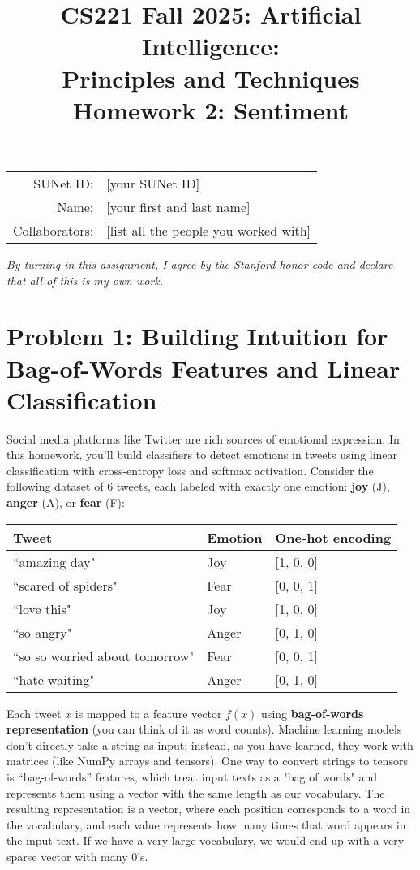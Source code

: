 \documentclass{article}
\title{\textbf{CS221 Fall 2025: Artificial Intelligence:\\ Principles and Techniques} \\Homework 2: Sentiment}
\date{}
\theoremstyle{case}
\theoremstyle{definition}
\begin{document}
\maketitle

\begin{center}
\begin{tabular}{rl}
SUNet ID: & [your SUNet ID] \\
Name: & [your first and last name] \\
Collaborators: & [list all the people you worked with]
\end{tabular}
\end{center}

\textit{By turning in this assignment, I agree by the Stanford honor code and declare
that all of this is my own work.} \\

\fontsize{12pt}{16pt}\selectfont

\section*{Problem 1: Building Intuition for Bag-of-Words Features and Linear Classification}

Social media platforms like Twitter are rich sources of emotional expression. In this homework, you'll build classifiers to detect emotions in tweets using linear classification with cross-entropy loss and softmax activation. Consider the following dataset of 6 tweets, each labeled with exactly one emotion: \textbf{joy} (J), \textbf{anger} (A), or \textbf{fear} (F):

\begin{table}[h]
\centering
\begin{tabular}{|l|l|l|}
\hline
Tweet & Emotion & One-hot encoding \\
\hline
``amazing day" & Joy & [1, 0, 0] \\
``scared of spiders" & Fear & [0, 0, 1] \\
``love this" & Joy & [1, 0, 0] \\
``so angry" & Anger & [0, 1, 0] \\
``so so worried about tomorrow" & Fear & [0, 0, 1] \\
``hate waiting" & Anger & [0, 1, 0] \\
\hline
\end{tabular}
\end{table}

Each tweet $x$ is mapped to a feature vector $f(x)$ using \textbf{bag-of-words representation} (you can think of it as word counts). Machine learning models don't directly take a string as input; instead, as you have learned, they work with matrices (like NumPy arrays and tensors). One way to convert strings to tensors is “bag-of-words” features, which treat input texts as a "bag of words" and represents them using a vector with the same length as our vocabulary. The resulting representation is a vector, where each position corresponds to a word in the vocabulary, and each value represents how many times that word appears in the input text. If we have a very large vocabulary, we would end up with a very sparse vector with many 0's.\\
\end{document}
